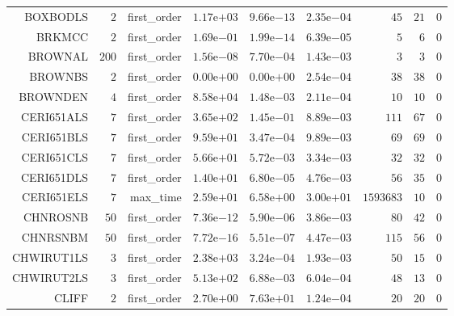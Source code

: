 \begin{longtable}{rrrrrrrrr}
BOXBODLS & \(     2\) & first\_order & \( 1.17\)e\(+03\) & \( 9.66\)e\(-13\) & \( 2.35\)e\(-04\) & \(    45\) & \(    21\) & \(     0\) \\
BRKMCC & \(     2\) & first\_order & \( 1.69\)e\(-01\) & \( 1.99\)e\(-14\) & \( 6.39\)e\(-05\) & \(     5\) & \(     6\) & \(     0\) \\
BROWNAL & \(   200\) & first\_order & \( 1.56\)e\(-08\) & \( 7.70\)e\(-04\) & \( 1.43\)e\(-03\) & \(     3\) & \(     3\) & \(     0\) \\
BROWNBS & \(     2\) & first\_order & \( 0.00\)e\(+00\) & \( 0.00\)e\(+00\) & \( 2.54\)e\(-04\) & \(    38\) & \(    38\) & \(     0\) \\
BROWNDEN & \(     4\) & first\_order & \( 8.58\)e\(+04\) & \( 1.48\)e\(-03\) & \( 2.11\)e\(-04\) & \(    10\) & \(    10\) & \(     0\) \\
CERI651ALS & \(     7\) & first\_order & \( 3.65\)e\(+02\) & \( 1.45\)e\(-01\) & \( 8.89\)e\(-03\) & \(   111\) & \(    67\) & \(     0\) \\
CERI651BLS & \(     7\) & first\_order & \( 9.59\)e\(+01\) & \( 3.47\)e\(-04\) & \( 9.89\)e\(-03\) & \(    69\) & \(    69\) & \(     0\) \\
CERI651CLS & \(     7\) & first\_order & \( 5.66\)e\(+01\) & \( 5.72\)e\(-03\) & \( 3.34\)e\(-03\) & \(    32\) & \(    32\) & \(     0\) \\
CERI651DLS & \(     7\) & first\_order & \( 1.40\)e\(+01\) & \( 6.80\)e\(-05\) & \( 4.76\)e\(-03\) & \(    56\) & \(    35\) & \(     0\) \\
CERI651ELS & \(     7\) & max\_time & \( 2.59\)e\(+01\) & \( 6.58\)e\(+00\) & \( 3.00\)e\(+01\) & \(1593683\) & \(    10\) & \(     0\) \\
CHNROSNB & \(    50\) & first\_order & \( 7.36\)e\(-12\) & \( 5.90\)e\(-06\) & \( 3.86\)e\(-03\) & \(    80\) & \(    42\) & \(     0\) \\
CHNRSNBM & \(    50\) & first\_order & \( 7.72\)e\(-16\) & \( 5.51\)e\(-07\) & \( 4.47\)e\(-03\) & \(   115\) & \(    56\) & \(     0\) \\
CHWIRUT1LS & \(     3\) & first\_order & \( 2.38\)e\(+03\) & \( 3.24\)e\(-04\) & \( 1.93\)e\(-03\) & \(    50\) & \(    15\) & \(     0\) \\
CHWIRUT2LS & \(     3\) & first\_order & \( 5.13\)e\(+02\) & \( 6.88\)e\(-03\) & \( 6.04\)e\(-04\) & \(    48\) & \(    13\) & \(     0\) \\
CLIFF & \(     2\) & first\_order & \( 2.70\)e\(+00\) & \( 7.63\)e\(+01\) & \( 1.24\)e\(-04\) & \(    20\) & \(    20\) & \(     0\) \\

\end{longtable}
